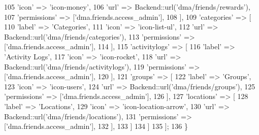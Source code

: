\begin{DoxyCode}
105                         \textcolor{stringliteral}{'icon'}          => \textcolor{stringliteral}{'icon-money'},
106                         \textcolor{stringliteral}{'url'}           => Backend::url(\textcolor{stringliteral}{'dma/friends/rewards'}),
107                         \textcolor{stringliteral}{'permissions'}   => [\textcolor{stringliteral}{'dma.friends.access\_admin'}],
108                     ],
109                     \textcolor{stringliteral}{'categories'} => [
110                         \textcolor{stringliteral}{'label'}         => \textcolor{stringliteral}{'Categories'},
111                         \textcolor{stringliteral}{'icon'}          => \textcolor{stringliteral}{'icon-list-ul'},
112                         \textcolor{stringliteral}{'url'}           => Backend::url(\textcolor{stringliteral}{'dma/friends/categories'}),
113                         \textcolor{stringliteral}{'permissions'}   => [\textcolor{stringliteral}{'dma.friends.access\_admin'}],
114                     ],  
115                     \textcolor{stringliteral}{'activitylogs'}   => [
116                         \textcolor{stringliteral}{'label'}         => \textcolor{stringliteral}{'Activity Logs'},
117                         \textcolor{stringliteral}{'icon'}          => \textcolor{stringliteral}{'icon-rocket'},
118                         \textcolor{stringliteral}{'url'}           => Backend::url(\textcolor{stringliteral}{'dma/friends/activitylogs'}),
119                         \textcolor{stringliteral}{'permissions'}   => [\textcolor{stringliteral}{'dma.friends.access\_admin'}],
120                     ],
121                     \textcolor{stringliteral}{'groups'}   => [
122                         \textcolor{stringliteral}{'label'}         => \textcolor{stringliteral}{'Groups'},
123                         \textcolor{stringliteral}{'icon'}          => \textcolor{stringliteral}{'icon-users'},
124                         \textcolor{stringliteral}{'url'}           => Backend::url(\textcolor{stringliteral}{'dma/friends/groups'}),
125                         \textcolor{stringliteral}{'permissions'}   => [\textcolor{stringliteral}{'dma.friends.access\_admin'}],
126                     ],
127                     \textcolor{stringliteral}{'locations'} => [
128                         \textcolor{stringliteral}{'label'}         => \textcolor{stringliteral}{'Locations'},
129                         \textcolor{stringliteral}{'icon'}          => \textcolor{stringliteral}{'icon-location-arrow'},
130                         \textcolor{stringliteral}{'url'}           => Backend::url(\textcolor{stringliteral}{'dma/friends/locations'}),
131                         \textcolor{stringliteral}{'permissions'}   => [\textcolor{stringliteral}{'dma.friends.access\_admin'}],
132                     ],                
133                 ]
134             ]
135         ];
136     \}
\end{DoxyCode}
\hypertarget{classDMA_1_1Friends_1_1Plugin_a1f5f007ec6f0f3f16516cf1a2e19d296}{}
